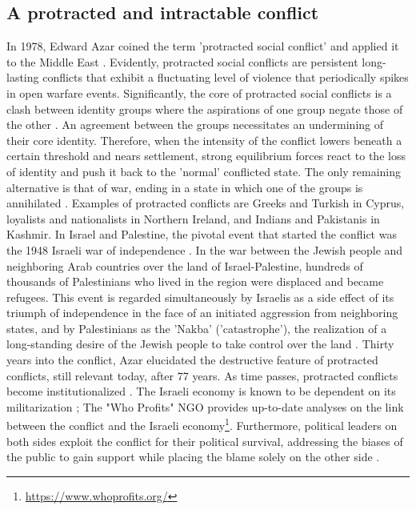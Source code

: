 \documentclass[dissertation,math,vertlayout,pdfa,colorlinks]{aaltoseries}
\begin{document}
\subsection{A protracted and intractable conflict}
In 1978, Edward Azar coined the term 'protracted social conflict' and applied it to the Middle East \cite{azarProtractedSocialConflict1978}. Evidently, protracted social conflicts are persistent long-lasting conflicts that exhibit a fluctuating level of violence that periodically spikes in open warfare events. Significantly, the core of protracted social conflicts is a clash between identity groups where the aspirations of one group negate those of the other \cite[p. 77]{fisherInteractiveConflictResolution1997}. An agreement between the groups necessitates an undermining of their core identity. Therefore, when the intensity of the conflict lowers beneath a certain threshold and nears settlement, strong equilibrium forces react to the loss of identity and push it back to the 'normal' conflicted state. The only remaining alternative is that of war, ending in a state in which one of the groups is annihilated \cite{azarProtractedSocialConflict1978}. Examples of protracted conflicts are Greeks and Turkish in Cyprus, loyalists and nationalists in Northern Ireland, and Indians and Pakistanis in Kashmir. In Israel and Palestine, the pivotal event that started the conflict was the 1948 Israeli war of independence \cite{selaIsraeliPalestinianMemories2016}. In the war between the Jewish people and neighboring Arab countries over the land of Israel-Palestine, hundreds of thousands of Palestinians who lived in the region were displaced and became refugees. This event is regarded simultaneously by Israelis as a side effect of its triumph of independence in the face of an initiated aggression from neighboring states, and by Palestinians as the 'Nakba' ('catastrophe'), the realization of a long-standing desire of the Jewish people to take control over the land  \cite{pogrund1948IndependenceNakba2008}. Thirty years into the conflict, Azar elucidated the destructive feature of protracted conflicts, still relevant today, after 77 years. As time passes, protracted conflicts become institutionalized \cite{azarProtractedSocialConflict1978}. The Israeli economy is known to be dependent on its militarization \cite{sandovalMilitaryIndustryIsraelPalestine2021}; The "Who Profits" NGO provides up-to-date analyses on the link between the conflict and the Israeli economy\footnote{\url{https://www.whoprofits.org/}}. Furthermore, political leaders on both sides exploit the conflict for their political survival, addressing the biases of the public to gain support while placing the blame solely on the other side \cite{behrmanExploitingCognitionBlame2021}.
\end{document}
